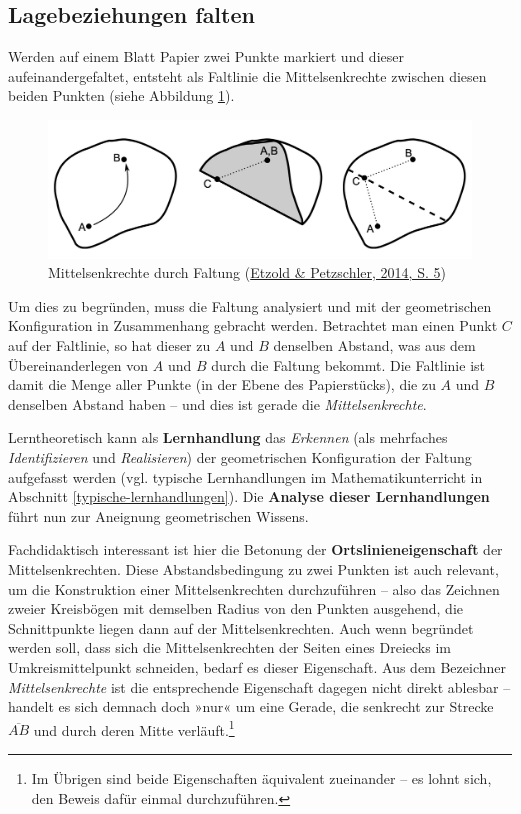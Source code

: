 \documentclass[
]{scrbook}
\theoremstyle{definition}
\theoremstyle{definition}
\theoremstyle{definition}
\theoremstyle{definition}
\theoremstyle{remark}
\begin{document}
\hypertarget{lagebeziehungen-falten}{%
\subsection{Lagebeziehungen falten}\label{lagebeziehungen-falten}}

Werden auf einem Blatt Papier zwei Punkte markiert und dieser aufeinandergefaltet, entsteht als Faltlinie die Mittelsenkrechte zwischen diesen beiden Punkten (siehe Abbildung \ref{fig:Mittelsenkrechte}).



\begin{figure}

{\centering \includegraphics[width=0.75\linewidth]{pictures/12-Mittelsenkrechte} 

}

\caption{Mittelsenkrechte durch Faltung (\protect\hyperlink{ref-Etzold2014a}{Etzold \& Petzschler, 2014, S. 5})}\label{fig:Mittelsenkrechte}
\end{figure}

Um dies zu begründen, muss die Faltung analysiert und mit der geometrischen Konfiguration in Zusammenhang gebracht werden. Betrachtet man einen Punkt \(C\) auf der Faltlinie, so hat dieser zu \(A\) und \(B\) denselben Abstand, was aus dem Übereinanderlegen von \(A\) und \(B\) durch die Faltung bekommt. Die Faltlinie ist damit die Menge aller Punkte (in der Ebene des Papierstücks), die zu \(A\) und \(B\) denselben Abstand haben -- und dies ist gerade die \emph{Mittelsenkrechte}.

Lerntheoretisch kann als \textbf{Lernhandlung} das \emph{Erkennen} (als mehrfaches \emph{Identifizieren} und \emph{Realisieren}) der geometrischen Konfiguration der Faltung aufgefasst werden (vgl. typische Lernhandlungen im Mathematikunterricht in Abschnitt \ref{typische-lernhandlungen}). Die \textbf{Analyse dieser Lernhandlungen} führt nun zur Aneignung geometrischen Wissens.

Fachdidaktisch interessant ist hier die Betonung der \textbf{Ortslinieneigenschaft} der Mittelsenkrechten. Diese Abstandsbedingung zu zwei Punkten ist auch relevant, um die Konstruktion einer Mittelsenkrechten durchzuführen -- also das Zeichnen zweier Kreisbögen mit demselben Radius von den Punkten ausgehend, die Schnittpunkte liegen dann auf der Mittelsenkrechten. Auch wenn begründet werden soll, dass sich die Mittelsenkrechten der Seiten eines Dreiecks im Umkreismittelpunkt schneiden, bedarf es dieser Eigenschaft. Aus dem Bezeichner \emph{Mittelsenkrechte} ist die entsprechende Eigenschaft dagegen nicht direkt ablesbar -- handelt es sich demnach doch »nur« um eine Gerade, die senkrecht zur Strecke \(\overline{AB}\) und durch deren Mitte verläuft.\footnote{Im Übrigen sind beide Eigenschaften äquivalent zueinander -- es lohnt sich, den Beweis dafür einmal durchzuführen.}
\end{document}
